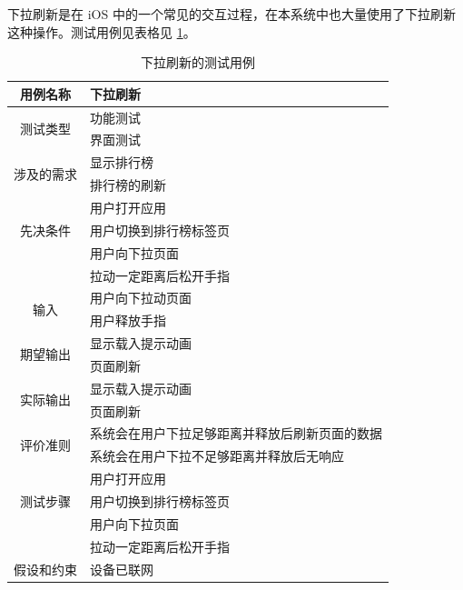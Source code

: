下拉刷新是在 iOS 中的一个常见的交互过程，在本系统中也大量使用了下拉刷新这种操作。测试用例见表格见 \ref{pull-to-refresh}。

\begin{table}
    \centering
    \caption{下拉刷新的测试用例}
    \label{pull-to-refresh}
    \begin{tabular}{c|l}
        \hline
        用例名称    & 下拉刷新       \\ \hline
        \multirow{2}{*}{测试类型}    & 功能测试     \\
                                    & 界面测试     \\ \hline
        \multirow{2}{*}{涉及的需求}  & 显示排行榜       \\
                                    & 排行榜的刷新  \\
        \multirow{3}{*}{先决条件}    & 用户打开应用    \\
                                    & 用户切换到排行榜标签页 \\
                                    & 用户向下拉页面    \\
                                    & 拉动一定距离后松开手指 \\ \hline
        \multirow{2}{*}{输入}       & 用户向下拉动页面 \\
                                    & 用户释放手指 \\ \hline
        \multirow{2}{*}{期望输出}    & 显示载入提示动画     \\
                                 & 页面刷新   \\ \hline
        \multirow{2}{*}{实际输出}    & 显示载入提示动画 \\
                                    & 页面刷新   \\ \hline
        \multirow{2}{*}{评价准则}   & 系统会在用户下拉足够距离并释放后刷新页面的数据 \\
                                   & 系统会在用户下拉不足够距离并释放后无响应 \\ \hline
        \multirow{3}{*}{测试步骤}   & 用户打开应用    \\
                                   & 用户切换到排行榜标签页 \\
                                   & 用户向下拉页面    \\
                                   & 拉动一定距离后松开手指 \\ \hline
        假设和约束  & 设备已联网 \\ \hline
    \end{tabular}
\end{table}

